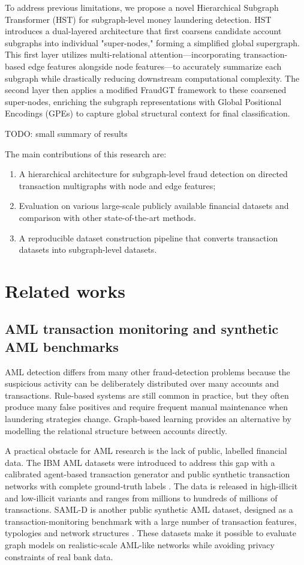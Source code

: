 \documentclass[12pt, twocolumn]{report}
\begin{document}
To address previous limitations, we propose a novel Hierarchical Subgraph Transformer (HST) for subgraph-level money laundering detection. HST introduces a dual-layered architecture that first coarsens candidate account subgraphs into individual "super-nodes," forming a simplified global supergraph. This first layer utilizes multi-relational attention—incorporating transaction-based edge features alongside node features—to accurately summarize each subgraph while drastically reducing downstream computational complexity. The second layer then applies a modified FraudGT framework to these coarsened super-nodes, enriching the subgraph representations with Global Positional Encodings (GPEs) to capture global structural context for final classification.

TODO: small summary of results

The main contributions of this research are:
\begin{enumerate}
    \item A hierarchical architecture for subgraph-level fraud detection on directed transaction multigraphs with node and edge features;
    \item Evaluation on various large-scale publicly available financial datasets and comparison with other state-of-the-art methods.
     \item A reproducible dataset construction pipeline that converts transaction datasets into subgraph-level datasets.
\end{enumerate}

\chapter{Related works}

\section{AML transaction monitoring and synthetic AML benchmarks}

AML detection differs from many other fraud-detection problems because the suspicious activity can be deliberately distributed over many accounts and transactions. Rule-based systems are still common in practice, but they often produce many false positives and require frequent manual maintenance when laundering strategies change. Graph-based learning provides an alternative by modelling the relational structure between accounts directly.

A practical obstacle for AML research is the lack of public, labelled financial data. The IBM AML datasets were introduced to address this gap with a calibrated agent-based transaction generator and public synthetic transaction networks with complete ground-truth labels \cite{altman2024realistic}. The data is released in high-illicit and low-illicit variants and ranges from millions to hundreds of millions of transactions. SAML-D is another public synthetic AML dataset, designed as a transaction-monitoring benchmark with a large number of transaction features, typologies and network structures \cite{oztas2023enhancing,oztas2024samldkaggle}. These datasets make it possible to evaluate graph models on realistic-scale AML-like networks while avoiding privacy constraints of real bank data.
\end{document}
